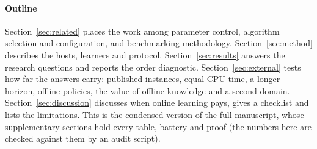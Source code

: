 \paragraph{Outline} Section~\ref{sec:related} places the work among parameter control, algorithm selection and configuration, and benchmarking methodology. Section~\ref{sec:method} describes the hosts, learners and protocol. Section~\ref{sec:results} answers the research questions and reports the order diagnostic. Section~\ref{sec:external} tests how far the answers carry: published instances, equal CPU time, a longer horizon, offline policies, the value of offline knowledge and a second domain. Section~\ref{sec:discussion} discusses when online learning pays, gives a checklist and lists the limitations. This is the condensed version of the full manuscript, whose supplementary sections hold every table, battery and proof (the numbers here are checked against them by an audit script).
